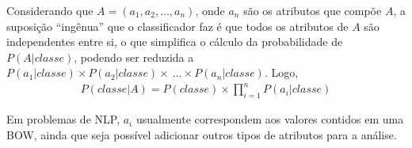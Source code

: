 Considerando que \(A= ( a_1, a_2, \ldots , a_n)\), onde \(a_n\) são os atributos que compõe \(A\), a suposição ``ingênua'' que o classificador faz é que todos os atributos de \(A\) são independentes entre si, o que simplifica o cálculo da probabilidade de \(P(A|classe)\), podendo ser reduzida a \(P(a_1|classe) \times P(a_2|classe) \times\ \ldots \times P(a_n|classe)\). Logo,
%
\begin{align}
P(classe|A) = P(classe) \times \prod_{i=1}^{n} P(a_i|classe)
\end{align}

Em problemas de NLP, \(a_i\) usualmente correspondem aos valores contidos em uma BOW, ainda que seja possível adicionar outros tipos de atributos para a análise.

